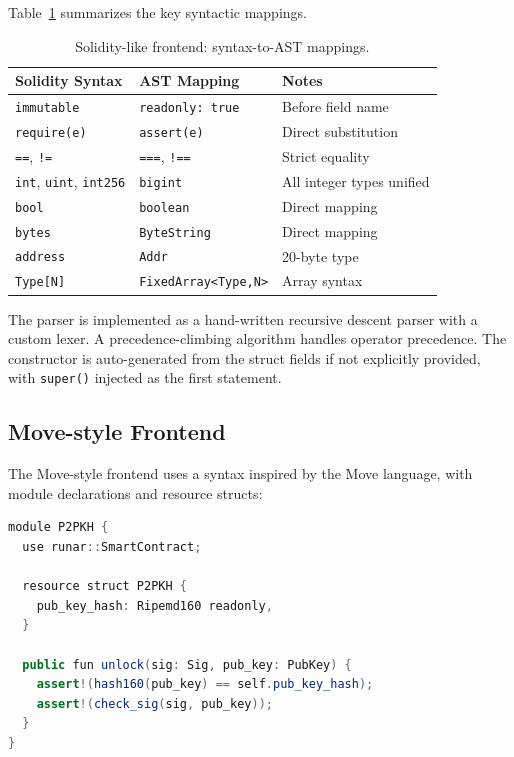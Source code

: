 \documentclass[11pt,a4paper]{article}
\newcommand{\bs}{\texttt{ByteString}}
\newcommand{\bigintty}{\texttt{bigint}}
\newcommand{\boolty}{\texttt{boolean}}
\begin{document}
Table~\ref{tab:sol-mapping} summarizes the key syntactic mappings.

\begin{table}[h]
\centering
\small
\begin{tabular}{@{}lll@{}}
\toprule
\textbf{Solidity Syntax} & \textbf{AST Mapping} & \textbf{Notes} \\
\midrule
\texttt{immutable} & \texttt{readonly: true} & Before field name \\
\texttt{require(e)} & \texttt{assert(e)} & Direct substitution \\
\texttt{==}, \texttt{!=} & \texttt{===}, \texttt{!==} & Strict equality \\
\texttt{int}, \texttt{uint}, \texttt{int256} & \bigintty & All integer types unified \\
\texttt{bool} & \boolty & Direct mapping \\
\texttt{bytes} & \bs & Direct mapping \\
\texttt{address} & \texttt{Addr} & 20-byte type \\
\texttt{Type[N]} & \texttt{FixedArray<Type,N>} & Array syntax \\
\bottomrule
\end{tabular}
\caption{Solidity-like frontend: syntax-to-AST mappings.}
\label{tab:sol-mapping}
\end{table}

The parser is implemented as a hand-written recursive descent parser with a
custom lexer. A precedence-climbing algorithm handles operator precedence.
The constructor is auto-generated from the struct fields if not explicitly
provided, with \texttt{super()} injected as the first statement.

\subsection{Move-style Frontend}
\label{sec:frontend-move}

The Move-style frontend uses a syntax inspired by the Move language, with
module declarations and resource structs:

\begin{lstlisting}[style=runar,language=Java,
  morekeywords={module,use,resource,struct,public,fun,let,mut,assert}]
module P2PKH {
  use runar::SmartContract;

  resource struct P2PKH {
    pub_key_hash: Ripemd160 readonly,
  }

  public fun unlock(sig: Sig, pub_key: PubKey) {
    assert!(hash160(pub_key) == self.pub_key_hash);
    assert!(check_sig(sig, pub_key));
  }
}
\end{lstlisting}
\end{document}

